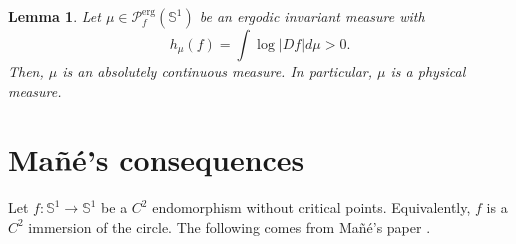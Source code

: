 \documentclass[12pt,a4paper,twoside]{article}
\theoremstyle{plain}
\newtheorem{theorem}{Theorem}[section]
\newtheorem{lemma}[theorem]{Lemma}
\theoremstyle{definition}
\newcommand{\T}{{\mathbb{S}^1}}
\newcommand{\cP}{{\mathcal P}}
\newcommand{\Sone}{\mathbb{S}^1}
\begin{document}
\begin{lemma}
    \label{lem:quian}
Let $\mu\in\cP^{\operatorname{erg}}_f(\T)$ be an ergodic invariant measure with 
\[
h_\mu(f)=\int\log|Df|d\mu>0.
\]
Then, $\mu$ is an absolutely continuous measure. In particular, $\mu$ is a physical measure. 
\end{lemma}





\section{Ma\~n\'e's consequences}	
Let $f\colon \Sone\to \Sone$ be a $C^2$ endomorphism without critical points. Equivalently, $f$ is a $C^2$ immersion of the circle. The following comes from Ma\~n\'e's paper \cite{mane}.

\end{document}
